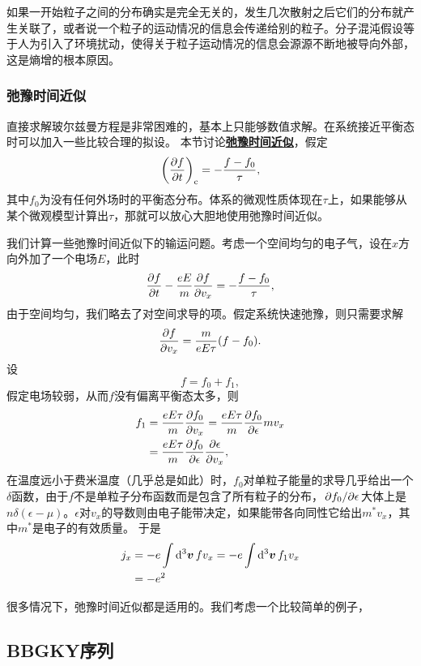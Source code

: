 \documentclass[hyperref, UTF8, a4paper]{ctexart}
\newcommand{\concept}[1]{\underline{\textbf{#1}}}
\begin{document}
如果一开始粒子之间的分布确实是完全无关的，发生几次散射之后它们的分布就产生关联了，或者说一个粒子的运动情况的信息会传递给别的粒子。分子混沌假设等于人为引入了环境扰动，使得关于粒子运动情况的信息会源源不断地被导向外部，这是熵增的根本原因。

\subsubsection{弛豫时间近似}

直接求解玻尔兹曼方程是非常困难的，基本上只能够数值求解。在系统接近平衡态时可以加入一些比较合理的拟设。
本节讨论\concept{弛豫时间近似}，假定
\begin{equation}
    \left(\pdv{f}{t}\right)_\text{c} = - \frac{f - f_0}{\tau},
\end{equation}
其中$f_0$为没有任何外场时的平衡态分布。体系的微观性质体现在$\tau$上，如果能够从某个微观模型计算出$\tau$，那就可以放心大胆地使用弛豫时间近似。

我们计算一些弛豫时间近似下的输运问题。考虑一个空间均匀的电子气，设在$x$方向外加了一个电场$E$，此时
\[
    \pdv{f}{t} - \frac{e E}{m} \pdv{f}{v_x} = - \frac{f - f_0}{\tau},
\]
由于空间均匀，我们略去了对空间求导的项。假定系统快速弛豫，则只需要求解
\[
    \pdv{f}{v_x} = \frac{m}{eE\tau} (f - f_0).
\]
设
\[
    f = f_0 + f_1,
\]
假定电场较弱，从而$f$没有偏离平衡态太多，则
\[
    \begin{aligned}
        f_1 &= \frac{e E \tau}{m} \pdv{f_0}{v_x} = \frac{e E \tau}{m} \pdv{f_0}{\epsilon} m v_x \\
        &= \frac{e E \tau}{m} \pdv{f_0}{\epsilon} \pdv{\epsilon}{v_x},
    \end{aligned}
\]
在温度远小于费米温度（几乎总是如此）时，$f_0$对单粒子能量的求导几乎给出一个$\delta$函数，由于$f$不是单粒子分布函数而是包含了所有粒子的分布，$\pdv*{f_0}{\epsilon}$大体上是$n \delta(\epsilon-\mu)$。$\epsilon$对$v_x$的导数则由电子能带决定，如果能带各向同性它给出$m^* v_x$，其中$m^*$是电子的有效质量。
于是
\[
    \begin{aligned}
        j_x &= - e \int \dd[3]{\vb*{v}} f v_x = - e \int \dd[3]{\vb*{v}} f_1 v_x \\
        &= - e^2 
    \end{aligned}
\]

很多情况下，弛豫时间近似都是适用的。我们考虑一个比较简单的例子，

\subsection{BBGKY序列}
\end{document}
